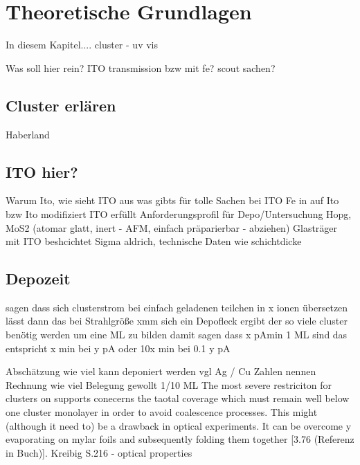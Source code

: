 \chapter{Theoretische Grundlagen}
In diesem Kapitel....
cluster - \cite{haberland}
uv vis \cite{kreibig}

Was soll hier rein? ITO transmission bzw mit fe? scout sachen?

\section{Cluster erlären}
Haberland
\section{ITO hier?}
Warum Ito, wie sieht ITO aus
was gibts für tolle Sachen  bei ITO
Fe in auf Ito bzw Ito modifiziert
ITO erfüllt Anforderungsprofil für Depo/Untersuchung
Hopg, MoS2 (atomar glatt, inert - AFM, einfach präparierbar - abziehen)
Glasträger mit ITO beshcichtet Sigma aldrich, technische Daten wie schichtdicke
\section{Depozeit}
\label{sec:depo}
sagen dass sich clusterstrom bei einfach geladenen teilchen in x ionen übersetzen lässt
dann das bei Strahlgröße xmm sich ein Depofleck ergibt der so viele cluster benötig werden um eine ML zu bilden
damit sagen dass x pAmin 1 ML sind
das entspricht x min bei y pA oder 10x min bei 0.1 y pA


Abschätzung wie viel kann deponiert werden vgl Ag / Cu Zahlen nennen
Rechnung wie viel Belegung gewollt 1/10 ML
The most severe restriciton for clusters on supports conecerns the taotal coverage which must remain well below one cluster monolayer in order to avoid coalescence processes.
This might (although it need to) be a drawback in optical experiments.
It can be overcome y evaporating on mylar foils and subsequently folding them together [3.76 (Referenz in Buch)].
Kreibig \cite[S.216]{Kreibig.1995} S.216 - optical properties

